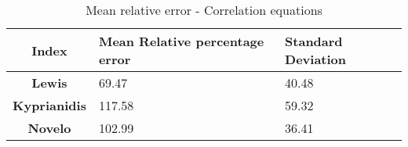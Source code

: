 \begin{table}[h!]
  \centering
  \begin{tabularx}{\textwidth}{||c|X|X||}
  \hline
    \cellcolor{gray!20}\textbf{Index} & \cellcolor{gray!20}\textbf{Mean Relative percentage error} & \cellcolor{gray!20}\textbf{Standard Deviation} \\ [0.5ex]
  \hline\hline
\centering
    \cellcolor{gray!20}\textbf{Lewis} & 69.47 & 40.48 \\
  \hline
    \cellcolor{gray!20}\textbf{Kyprianidis} & 117.58 & 59.32 \\
  \hline
    \cellcolor{gray!20}\textbf{Novelo} & 102.99 & 36.41 \\
  \hline
  \end{tabularx}
  \caption{Mean relative error - Correlation equations}
  \label{meanEC}
\end{table}
